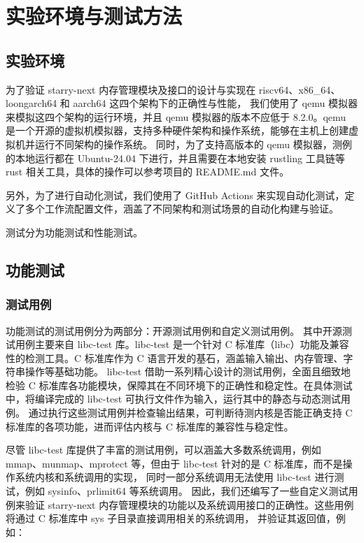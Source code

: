 
\chapter{实验环境与测试方法}

\section{实验环境}

为了验证 starry-next 内存管理模块及接口的设计与实现在 riscv64、x86\_64、loongarch64 和 aarch64 这四个架构下的正确性与性能，
我们使用了 qemu 模拟器来模拟这四个架构的运行环境，并且 qemu 模拟器的版本不应低于 8.2.0。qemu 是一个开源的虚拟机模拟器，支持多种硬件架构和操作系统，能够在主机上创建虚拟机并运行不同架构的操作系统。
同时，为了支持高版本的 qemu 模拟器，测例的本地运行都在 Ubuntu-24.04 下进行，并且需要在本地安装 rustling 工具链等 rust 相关工具，具体的操作可以参考项目的 README.md 文件。

另外，为了进行自动化测试，我们使用了 GitHub Actions 来实现自动化测试，定义了多个工作流配置文件，涵盖了不同架构和测试场景的自动化构建与验证。

测试分为功能测试和性能测试。

\section{功能测试}

\subsection{测试用例}

功能测试的测试用例分为两部分：开源测试用例和自定义测试用例。
其中开源测试用例主要来自 libc-test 库。libc-test 是一个针对 C 标准库（libc）功能及兼容性的检测工具。C 标准库作为 C 语言开发的基石，涵盖输入输出、内存管理、字符串操作等基础功能。
libc-test 借助一系列精心设计的测试用例，全面且细致地检验 C 标准库各功能模块，保障其在不同环境下的正确性和稳定性。在具体测试中，将编译完成的 libc-test 可执行文件作为输入，运行其中的静态与动态测试用例。
通过执行这些测试用例并检查输出结果，可判断待测内核是否能正确支持 C 标准库的各项功能，进而评估内核与 C 标准库的兼容性与稳定性。

尽管 libc-test 库提供了丰富的测试用例，可以涵盖大多数系统调用，例如 mmap、munmap、mprotect 等，但由于 libc-test 针对的是 C 标准库，而不是操作系统内核和系统调用的实现，
同时一部分系统调用无法使用 libc-test 进行测试，例如 sysinfo、prlimit64 等系统调用。
因此，我们还编写了一些自定义测试用例来验证 starry-next 内存管理模块的功能以及系统调用接口的正确性。这些用例将通过 C 标准库中 sys 子目录直接调用相关的系统调用，
并验证其返回值，例如：

